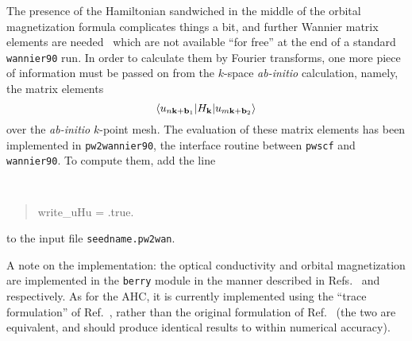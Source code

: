 The presence of the Hamiltonian sandwiched in the middle of the
orbital magnetization formula complicates things a bit, and further
Wannier matrix elements are needed~\cite{lopez-prb12} which are not
available ``for free'' at the end of a standard {\tt wannier90}
run. In order to calculate them by Fourier transforms, one more piece
of information must be passed on from the $k$-space {\it ab-initio}
calculation, namely, the matrix elements
%
$$\langle u_{n{\bf k}+{\bf b}_1}\vert
H_{\bf k}\vert u_{m{\bf k}+{\bf b}_2}\rangle
$$
%
over the {\it ab-initio} $k$-point mesh.  The evaluation of these
matrix elements has been implemented in {\tt pw2wannier90}, the
interface routine between {\tt pwscf} and {\tt wannier90}. To compute
them, add the line
%
{\tt
\begin{quote}
write\_uHu = .true.
\end{quote}
}
%
to the input file {\tt seedname.pw2wan}.

A note on the implementation: the optical conductivity and orbital
magnetization are implemented in the {\tt berry} module in the manner
described in Refs.~\cite{yates-prb07} and \cite{lopez-prb12}
respectively. As for the AHC, it is currently implemented using the
``trace formulation'' of Ref.~\cite{lopez-prb12}, rather than the
original formulation of Ref.~\cite{wang-prb06} (the two are
equivalent, and should produce identical results to within numerical
accuracy).

